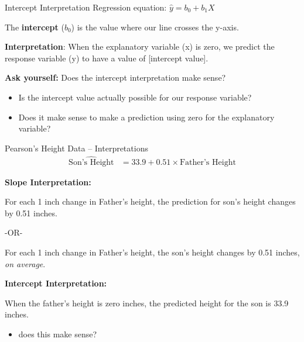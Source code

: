 \documentclass{beamer}
\begin{document}
\begin{frame}{Intercept Interpretation}
Regression equation: $\hat{y} = b_0 + b_1X$ \vspace{2mm}

The \textbf{intercept} ($b_0$) is the value where our line crosses the y-axis. \vspace{10mm}


\textbf{Interpretation}: When the explanatory variable (x) is zero, we predict the response variable (y) to have a value of [intercept value]. \vspace{6mm}

\textbf{Ask yourself:} Does the intercept interpretation make sense?
\begin{itemize}
    \item Is the intercept value actually possible for our response variable?
    \item Does it make sense to make a prediction using zero for the explanatory variable?
\end{itemize}
\end{frame}

\begin{frame}{Pearson's Height Data -- Interpretations}
    \begin{align*}
\widehat{\text{Son's Height}} &= 33.9 + 0.51 \times \text{Father's Height}
\end{align*}

\textbf{Slope Interpretation:} 

For each 1 inch change in Father’s height, the prediction for son's height changes by 0.51 inches.

-OR-

For each 1 inch change in Father’s height, the son's height changes by 0.51 inches, \textit{on average}. \vspace{4mm}

\textbf{Intercept Interpretation:}

When the father's height is zero inches, the predicted height for the son is 33.9 inches.
\begin{itemize}
    \item does this make sense?
\end{itemize}
\end{frame}
\end{document}
